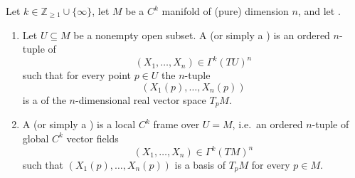 \begin{definition} \label{definition:local_and_global_frames_of_the_tangent_bundle_of_a_differentiable_manifold}
Let $k \in \mathbb{Z}_{\geq 1} \cup \{\infty\}$, let $M$ be a $C^k$ manifold of (pure) dimension $n$, and let .

\begin{enumerate}
  \item Let $U \subseteq M$ be a nonempty open subset.
  A  (or simply a ) is an ordered $n$-tuple of 
  $$ (X_1,\dots,X_n) \in \Gamma^k(TU)^n $$
   such that for every point $p \in U$ the $n$-tuple
  $$ (X_1(p),\dots,X_n(p)) $$
  is a  of the $n$-dimensional real vector space $T_pM$.

  \item A  (or simply a ) is a local $C^k$ frame over $U = M$, i.e.\ an ordered $n$-tuple of global $C^k$ vector fields
  $$
  (X_1,\dots,X_n) \in \Gamma^k(TM)^n
  $$
  such that $(X_1(p),\dots,X_n(p))$ is a basis of $T_pM$ for every $p \in M$.
\end{enumerate}
\end{definition}